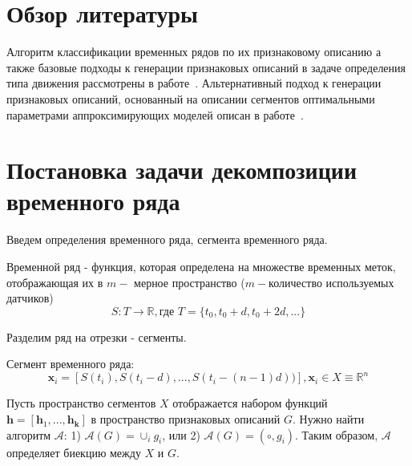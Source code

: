 \documentclass[12pt, fleqn, unicode]{article}
\begin{document}
\newpage
\section{Обзор литературы}
Алгоритм классификации временных рядов по их признаковому описанию а также
базовые подходы к генерации признаковых описаний в
 задаче определения типа движения рассмотрены в работе~\cite{Kuznetsov2015}.
Альтернативный подход к генерации признаковых описаний, основанный на описании
сегментов оптимальными параметрами аппроксимирующих моделей описан в
работе~\cite{Karasikov2016}.

\newpage
\section{Постановка задачи декомпозиции временного ряда}

 Введем определения временного ряда, сегмента временного ряда.
\begin{Def}
Временной ряд - функция, которая определена на множестве временных меток, отображающая их в $m-$ мерное пространство ($m-$количество используемых датчиков)
 $$S: T\rightarrow\mathbb{R},\text{где } T=\{t_0, t_0 + d, t_0 + 2d, ...\}$$
\end{Def}
Разделим ряд на отрезки - сегменты.
\begin{Def}
Сегмент временного ряда:
$$\boldsymbol{x}_i = [S(t_i), S(t_i - d), ..., S(t_i - (n - 1)d))], \boldsymbol{x}_i \in X\equiv\mathbb{R}^n$$
\end{Def}

Пусть пространство сегментов $X$ отображается набором функций $\boldsymbol{h} = [\boldsymbol{h}_1, ..., \boldsymbol{h_k}]$ в пространство признаковых описаний $G$.
 Нужно найти алгоритм $\mathcal{A}$:  1) $\mathcal{A}(G) = \cup_{i} g_i$, или 2) $\mathcal{A}(G) = (\circ, g_i) $. Таким образом, $\mathcal{A}$ определяет биекцию между $X$ и $G$.

\end{document}
